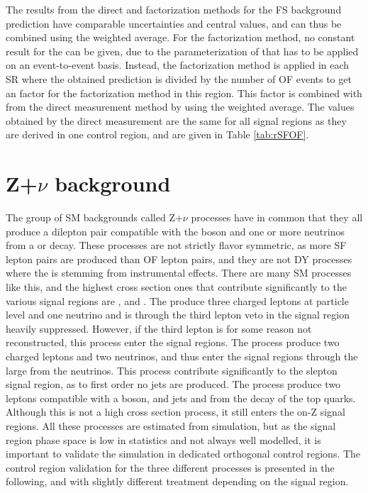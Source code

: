 The results from the direct and factorization methods for the FS background prediction have comparable uncertainties and central values, and can thus be combined using the weighted average. 
For the factorization method, no constant result for the \Rsfof can be given, due to the parameterization of \rmue that has to be applied on an event-to-event basis.
Instead, the factorization method is applied in each SR where the obtained prediction is divided by the number of OF events to get an \Rsfof factor for the factorization method in this region. 
This factor is combined with \Rsfof from the direct measurement method by using the weighted average.
The \Rsfof values obtained by the direct measurement are the same for all signal regions as they are derived in one control region, and are given in Table \ref{tab:rSFOF}. 
\section{Z+$\nu$ background}\label{sec:Znu}
\noindent
\justify
The group of SM backgrounds called Z+$\nu$ processes have in common that they all produce a dilepton pair compatible with the \PZ boson and one or more neutrinos from a \PZ or \PW decay. 
These processes are not strictly flavor symmetric, as more SF lepton pairs are produced than OF lepton pairs, and they are not DY processes where the \ptmiss is stemming from instrumental effects. 
There are many SM processes like this, and the highest cross section ones that contribute significantly to the various signal regions are \PWZ, \PZZ and \ttZ. 
The \PWZ produce three charged leptons at particle level and one neutrino and is through the third lepton veto in the signal region heavily suppressed. 
However, if the third lepton is for some reason not reconstructed, this process enter the signal regions.  
The \PZZ process produce two charged leptons and two neutrinos, and thus enter the signal regions through the large \ptmiss from the neutrinos. 
This process contribute significantly to the slepton signal region, as to first order no jets are produced. 
The \ttZ process produce two leptons compatible with a \PZ boson, and jets and \ptmiss from the decay of the top quarks. 
Although this is not a high cross section process, it still enters the on-Z signal regions. 
All these processes are estimated from simulation, but as the signal region phase space is low in statistics and not always well modelled, it is important to validate the simulation in dedicated orthogonal control regions. 
The control region validation for the three different processes is presented in the following, and with slightly different treatment depending on the signal region.  
